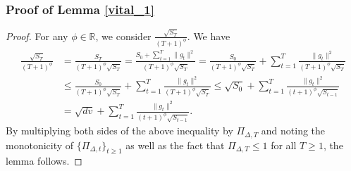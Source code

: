 \documentclass{article} %
\begin{document}
\subsubsection{Proof of Lemma \ref{vital_1}}
\begin{proof}
For any $\phi \in \mathbb{R}$, we consider $\frac{\sqrt{S_{T}}}{(T+1)^{\phi}}$. We have
\begin{align*}
\frac{\sqrt{S_{T}}}{(T+1)^{\phi}}&=\frac{{S_{T}}}{(T+1)^{\phi}\sqrt{S_{T}}}=\frac{S_{0}+\sum_{t=1}^{T}\|g_{t}\|^{2}}{(T+1)^{\phi}\sqrt{S_{T}}} =\frac{S_{0}}{(T+1)^{\phi}\sqrt{S_{T}}} +\sum_{t=1}^{T}\frac{\|g_{t}\|^{2}}{(T+1)^{\phi}\sqrt{S_{T}}}\\&\le \frac{S_{0}}{(T+1)^{\phi}\sqrt{S_{T}}} +\sum_{t=1}^{T}\frac{\|g_{t}\|^{2}}{(T+1)^{\phi}\sqrt{S_{T}}}\le {\sqrt{S_{0}}}+\sum_{t=1}^{T}\frac{\|g_{t}\|^{2}}{(t+1)^{\phi}\sqrt{S_{t-1}}}\\&={\sqrt{dv}}+\sum_{t=1}^{T}\frac{\|g_{t}\|^{2}}{(t+1)^{\phi}\sqrt{S_{t-1}}}.
\end{align*}
By multiplying both sides of the above inequality by \(\Pi_{\Delta,T}\) and noting the monotonicity of \(\{\Pi_{\Delta,t}\}_{t \geq 1}\) as well as the fact that \(\Pi_{\Delta,T} \leq 1\) for all \(T \geq 1\), the lemma follows.
\end{proof}
\end{document}

